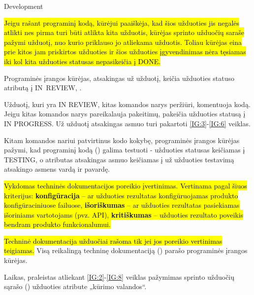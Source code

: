 \begin{processTable}{Development}
{        \item \hl{Jeigu rašant programinį kodą, kūrėjui paaiškėja, kad šios užduoties jis negalės atlikti nes pirma turi būti atlikta kita užduotis, kūrėjas sprinto užduočių saraše  pažymi užduotį, nuo kurio priklauso jo atliekama užduotis. Toliau kūrėjas eina prie kitos jam priskirtos užduoties ir šios užduoties įgyvendinimas nėra tęsiamas iki kol kita užduoties statusas nepasikeičia į DONE.}
        \label{IG:3}

        \item Programinės įrangos kūrėjas, atsakingas už užduotį, keičia užduoties statuso atributą į \mbox{IN~REVIEW}, .
        \label{IG:5}

        \item Užduotį, kuri yra IN REVIEW, kitas komandos narys peržiūri, komentuoja kodą. Jeigu kitas komandos narys pareikalauja pakeitimų, pakeičia užduoties statusą į IN PROGRESS. Už užduotį atsakingas asmuo turi pakartoti \ref{IG:3}-\ref{IG:6} veiklas.
        \label{IG:6}
        \item Kitam komandos nariui patvirtinus kodo kokybę, programinės įrangos kūrėjas pažymi, kad programinį kodą () galima testuoti - užduoties statusas keičiamas į TESTING, o atributas atsakingas asmuo  keičiamas į už užduoties testavimą atsakingo asmens vardą ir pavardę.  
        \label{IG:7}

        \item \hl{Vykdomas techninės dokumentacijos poreikio įvertinimas. Vertinama pagal šiuos kriterijus: \textbf{konfigūracija} -- ar užduoties rezultatas konfigūruojamas produkto konfigūraciniuose failuose, \textbf{išoriškumas} -- ar užduoties rezultatas pasiekiamas išoriniams vartotojams (pvz. API), \textbf{kritiškumas} -- užduoties rezultato poveikis bendram produkto funkcionalumui.}

        \item \hl{Techninė dokumentacija užduočiai rašoma tik jei jos poreikio vertinimas teigiamas.} Visą reikalingą techninę dokumentaciją () parašo programinės įrangos kūrėjas.
        \label{IG:8}

        \item Laikas, praleistas atliekant \ref{IG:2}-\ref{IG:8} veiklas pažymimas sprinto užduočių sąrašo ()  užduoties atribute  „kūrimo valandos“.
    }
\end{processTable}

